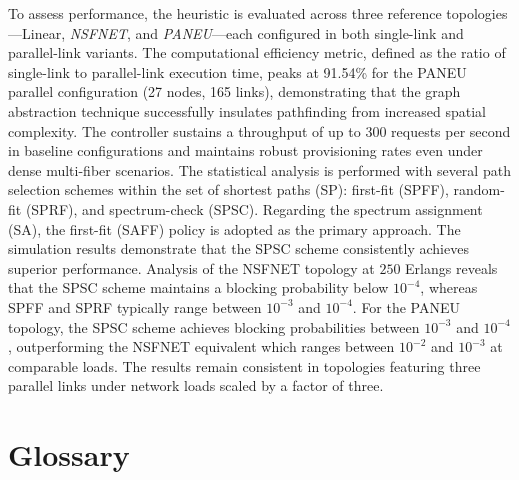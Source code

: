 \documentclass[12pt, a4paper, twoside, openright]{report}
\begin{document}
To assess performance, the heuristic is evaluated across three reference topologies---Linear, \textit{NSFNET}, and \textit{PANEU}---each configured in both single-link and parallel-link variants. The computational efficiency metric, defined as the ratio of single-link to parallel-link execution time, peaks at 91.54\% for the PANEU parallel configuration (27 nodes, 165 links), demonstrating that the graph abstraction technique successfully insulates pathfinding from increased spatial complexity. The controller sustains a throughput of up to 300 requests per second in baseline configurations and maintains robust provisioning rates even under dense multi-fiber scenarios. The statistical analysis is performed with several path selection schemes within the set of shortest paths (SP): first-fit (SPFF), random-fit (SPRF), and spectrum-check (SPSC). Regarding the spectrum assignment (SA), the first-fit (SAFF) policy is adopted as the primary approach. The simulation results demonstrate that the SPSC scheme consistently achieves superior performance. Analysis of the NSFNET topology at $250$ Erlangs reveals that the SPSC scheme maintains a blocking probability below $10^{-4}$, whereas SPFF and SPRF typically range between $10^{-3}$ and $10^{-4}$. For the PANEU topology, the SPSC scheme achieves blocking probabilities between $10^{-3}$ and $10^{-4}$, outperforming the NSFNET equivalent which ranges between $10^{-2}$ and $10^{-3}$ at comparable loads. The results remain consistent in topologies featuring three parallel links under network loads scaled by a factor of three.


\tableofcontents
\clearpage
\listoffigures
{}
\clearpage
\listoftables
{}
\chapter*{Glossary}
\end{document}
